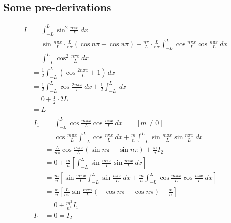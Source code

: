 \documentclass[12pt]{article}
\numberwithin{equation}{subsection}
\begin{document}
\subsection{Some pre-derivations}

\begin{align*}
    I &= \int_{-L}^{L} {\sin^2{\frac{n\pi x}{L}}} \: d{x} \\
    &= \sin{\frac{n\pi x}{L}} \cdot \frac{L}{n\pi} (\cos{n\pi} - \cos{n\pi}) + \frac{n\pi}{L}\cdot\frac{L}{n\pi} \int_{-L}^{L} {\cos{\frac{n\pi x}{L}}\cos{\frac{n\pi x}{L}}} \: d{x} \\
    &= \int_{-L}^{L} {\cos^2{\frac{n\pi x}{L}}} \: d{x} \\
    &= \frac{1}{2} \int_{-L}^{L} {\left( \cos{\frac{2n\pi x}{L} + 1} \right)} \: d{x} \\
    &= \frac{1}{2} \int_{-L}^{L} {\cos{\frac{2n\pi x}{L}}} \: d{x} + \frac{1}{2} \int_{-L}^{L} {} \: d{x} \\
    &= 0 + \frac{1}{2} \cdot 2L \\
    &= L \\
\end{align*}
\begin{align*}
    I_1 &= \int_{-L}^{L} {\cos{\frac{m\pi x}{L}} \cos{\frac{n\pi x}{L}}} \: d{x} \qquad [m \neq 0] \\
    &= \cos{\frac{m\pi x}{L}} \int_{-L}^{L} {\cos{\frac{n\pi x}{L}}} \: d{x} + \frac{m}{n} \int_{-L}^{L} {\sin{\frac{m\pi x}{L}} \sin{\frac{n\pi x}{L}}} \: d{x} \\
    &= \frac{L}{n\pi} \cos{\frac{m\pi x}{L}} (\sin{n\pi} + \sin{n\pi}) + \frac{m}{n} I_2 \\
    &= 0 + \frac{m}{n} \left[ \int_{-L}^{L} {\sin{\frac{m\pi x}{L}} \sin{\frac{n\pi x}{L}}} \: d{x} \right] \\
    &= \frac{m}{n} \left[ \sin{\frac{m\pi x}{L}} \int_{-L}^{L} {\sin{\frac{n\pi x}{L}}} \: d{x} + \frac{m}{n} \int_{-L}^{L} {\cos{\frac{m\pi x}{L}} \cos{\frac{n\pi x}{L}}} \: d{x} \right] \\
    &= \frac{m}{n} \left[ \frac{L}{n\pi} \sin{\frac{m\pi x}{L}} (-\cos{n\pi} + \cos{n\pi}) + \frac{m}{n} \right] \\
    &= 0 + \frac{m^2}{n^2}I_1 \\
    I_1 &= 0 = I_2
\end{align*}
\end{document}
